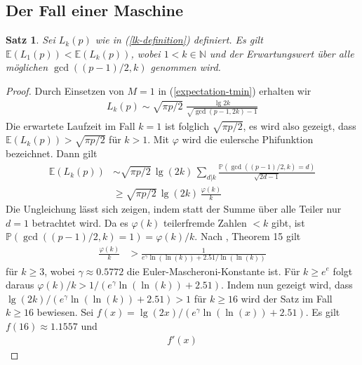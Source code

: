 \documentclass[a4paper, 10pt, ngerman]{article}
\newcommand{\E}{\mathbb{E}}
\newcommand{\N}{\mathbb{N}}
\renewcommand{\P}{\mathbb{P}}
\newtheorem{theorem}{Satz}
\begin{document}
    \subsection{Der Fall einer Maschine}

    \begin{theorem}
        \label{theorem:optimal-k-m1}
        Sei $L_k(p)$ wie in (\ref{lk-definition}) definiert. Es gilt $\E(L_1(p)) < \E(L_k(p))$, wobei $1 < k \in \N$ und der Erwartungswert über alle möglichen $\gcd((p - 1)/2, k)$ genommen wird.
    \end{theorem}

    \begin{proof}
        Durch Einsetzen von $M = 1$ in (\ref{expectation-tmin}) erhalten wir
        \begin{align*}
            L_k(p) \sim \sqrt {\pi p / 2} \;
            \frac {\lg 2k} {\sqrt{\gcd(p - 1, 2k) - 1}}
        \end{align*}
        Die erwartete Laufzeit im Fall $k = 1$ ist folglich $\sqrt{\pi p/2}$, es wird also gezeigt, dass $\E(L_k(p)) > \sqrt{\pi p / 2}$ für $k > 1$. Mit $\varphi$ wird die eulersche Phifunktion bezeichnet. Dann gilt
        \begin{align*}
            \E(L_k(p))
             & \sim \sqrt{\pi p / 2} \, \lg (2k) \,
            \sum_{d | k} \frac {\P(\gcd((p - 1)/2, k) = d)}
            { \sqrt {2d - 1}} \nonumber                                 \\
             & \ge \sqrt{\pi p / 2} \, \lg (2k) \, \frac {\varphi(k)} k
        \end{align*}
        Die Ungleichung lässt sich zeigen, indem statt der Summe über alle Teiler nur $d = 1$ betrachtet wird. Da es $\varphi(k)$ teilerfremde Zahlen $< k$ gibt, ist $\P(\gcd((p - 1)/2, k) = 1) = \varphi(k)/k$. Nach \cite{rs62}, Theorem 15 gilt
        \begin{align*}
            \frac {\varphi(k)} k
             & > \frac 1 {e^\gamma \ln (\ln (k)) + 2.51 / \ln (\ln (k))}
        \end{align*}
        für $k \ge 3$, wobei $\gamma \approx 0.5772$ die Euler-Mascheroni-Konstante ist. Für $k \ge e^e$ folgt daraus $\varphi(k) / k > 1/(e^\gamma \ln(\ln(k)) + 2.51)$. Indem nun gezeigt wird, dass $\lg (2k) / (e^\gamma \ln (\ln (k)) + 2.51) > 1$ für $k \ge 16$ wird der Satz im Fall $k \ge 16$ bewiesen. Sei $f(x) = \lg (2x) / (e^\gamma \ln (\ln (x)) + 2.51)$. Es gilt $f(16) \approx 1.1557$ und
        \begin{align*}
            f'(x)

\end{align*}
\end{proof}
\end{document}
